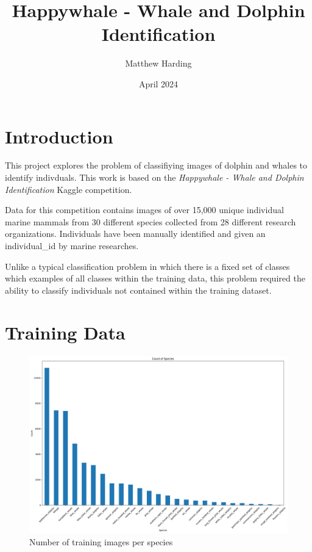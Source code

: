\documentclass{article}
\title{Happywhale - Whale and Dolphin Identification}
\author{Matthew Harding}
\date{April 2024}
\begin{document}
\maketitle

\section{Introduction}
This project explores the problem of classifiying images of dolphin and whales to identify indivduals. This work 
is based on the \emph{Happywhale - Whale and Dolphin Identification} Kaggle competition.\par

\cite{article_key}

Data for this competition contains images of over 15,000 unique individual marine mammals from 30 different species collected from 28 different research organizations. 
Individuals have been manually identified and given an individual\_id by marine researches.\par

Unlike a typical classification problem in which there is a fixed set of classes which examples of all classes within the training data, this problem required the ability to classify individuals not contained within the training dataset.

\section{Training Data}

\begin{figure}
    \includegraphics[width=\linewidth]{species_histogram.png}
    \caption{Number of training images per species}
    \label{fig:species_count_histogram}
\end{figure}
\end{document}
